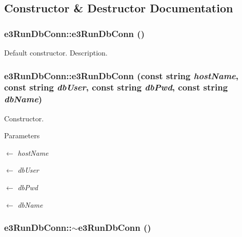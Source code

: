 \subsection{Constructor \& Destructor Documentation}
\hypertarget{classe3RunDbConn_a3b9a10475acdd79085b58a919dc66835}{
\subsubsection[{e3RunDbConn}]{\setlength{\rightskip}{0pt plus 5cm}e3RunDbConn::e3RunDbConn ()}}
\label{classe3RunDbConn_a3b9a10475acdd79085b58a919dc66835}


Default constructor. Description. \hypertarget{classe3RunDbConn_a58fbb7176357f93c0e576bc4feffcc26}{
\subsubsection[{e3RunDbConn}]{\setlength{\rightskip}{0pt plus 5cm}e3RunDbConn::e3RunDbConn (const string {\em hostName}, \/  const string {\em dbUser}, \/  const string {\em dbPwd}, \/  const string {\em dbName})}}
\label{classe3RunDbConn_a58fbb7176357f93c0e576bc4feffcc26}


Constructor. 
\begin{DoxyParams}{Parameters}
\item[\mbox{$\leftarrow$} {\em hostName}]\item[\mbox{$\leftarrow$} {\em dbUser}]\item[\mbox{$\leftarrow$} {\em dbPwd}]\item[\mbox{$\leftarrow$} {\em dbName}]\end{DoxyParams}
\hypertarget{classe3RunDbConn_a9ba77cdf2ee9a6097344b8280c2473a1}{
\subsubsection[{$\sim$e3RunDbConn}]{\setlength{\rightskip}{0pt plus 5cm}e3RunDbConn::$\sim$e3RunDbConn ()}}
\label{classe3RunDbConn_a9ba77cdf2ee9a6097344b8280c2473a1}


